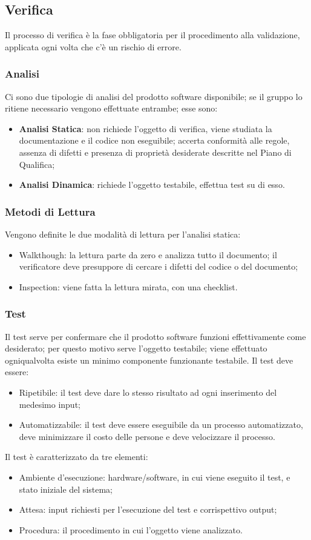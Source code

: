 \subsection{Verifica}
Il processo di verifica è la fase obbligatoria per il procedimento alla validazione, applicata ogni volta 
che c’è un rischio di errore.
\subsubsection{Analisi}
Ci sono due tipologie di analisi del prodotto software disponibile; se il gruppo lo ritiene necessario 
vengono effettuate entrambe; esse sono:
\begin{itemize}
\item \textbf{Analisi Statica}: non richiede l’oggetto di verifica, viene studiata la documentazione e il 
codice non eseguibile; accerta conformità alle regole, assenza di difetti e presenza di proprietà desiderate 
descritte nel Piano di Qualifica;
\item \textbf{Analisi Dinamica}: richiede l’oggetto testabile, effettua test su di esso.
\end{itemize}

\subsubsection{Metodi di Lettura}
Vengono definite le due modalità di lettura per l’analisi statica:
\begin{itemize}
\item Walkthough: la lettura parte da zero e analizza tutto il documento; il verificatore deve 
presuppore di cercare i difetti del codice o del documento;
\item Inspection: viene fatta la lettura mirata, con una checklist.
\end{itemize}

\subsubsection{Test}
Il test serve per confermare che il prodotto software funzioni effettivamente come desiderato; per questo 
motivo serve l’oggetto testabile; viene effettuato ogniqualvolta esiste un minimo componente funzionante 
testabile. Il test deve essere: 
\begin{itemize}
\item Ripetibile: il test deve dare lo stesso risultato ad ogni inserimento del medesimo input;
\item Automatizzabile: il test deve essere eseguibile da un processo automatizzato, deve minimizzare il costo 
delle persone e deve velocizzare il processo.
\end{itemize}
Il test è caratterizzato da tre elementi:
\begin{itemize}
\item Ambiente d’esecuzione: hardware/software, in cui viene eseguito il test, e stato iniziale del sistema;
\item Attesa: input richiesti per l’esecuzione del test e corrispettivo output;
\item Procedura: il procedimento in cui l’oggetto viene analizzato.
\end{itemize}

